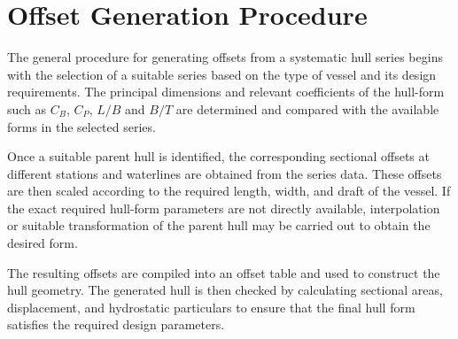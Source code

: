 \documentclass[12pt,a4paper,twoside]{report}
\begin{document}
\section{Offset Generation Procedure}
The general procedure for generating offsets from a systematic hull series begins with the selection of a suitable series based on the type of vessel and its design requirements. The principal dimensions and relevant coefficients of the hull-form such as \(C_B\), \(C_P\), \(L/B\) and \(B/T\) are determined and compared with the available forms in the selected series.
\vspace{\baselineskip}\par\noindent Once a suitable parent hull is identified, the corresponding sectional offsets at different stations and waterlines are obtained from the series data. These offsets are then scaled according to the required length, width, and draft of the vessel. If the exact required hull-form parameters are not directly available, interpolation or suitable transformation of the parent hull may be carried out to obtain the desired form.
\vspace{\baselineskip}\par\noindent The resulting offsets are compiled into an offset table and used to construct the hull geometry. The generated hull is then checked by calculating sectional areas, displacement, and hydrostatic particulars to ensure that the final hull form satisfies the required design parameters.
\end{document}
